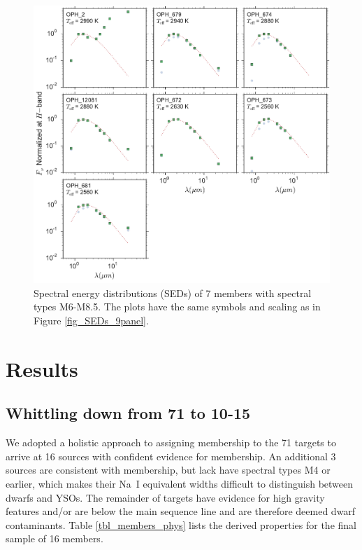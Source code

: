 \documentclass[12pt,preprint]{aastex}
\begin{document}
\begin{figure}[ht!]
  \caption{ Spectral energy distributions (SEDs) of 7 members with spectral types M6-M8.5.  The plots have the same symbols and scaling as in Figure \ref{fig_SEDs_9panel}.  \label{fig_SEDs_7panel} }
\centering
\includegraphics[scale=0.6]{figures/SEDS_7panel}
\end{figure}

\section{Results}
\subsection{Whittling down from 71 to 10-15}
We adopted a holistic approach to assigning membership to the 71 targets to arrive at 16 sources with confident evidence for membership.  An additional 3 sources are consistent with membership, but lack have spectral types M4 or earlier, which makes their Na~I equivalent widths difficult to distinguish between dwarfs and YSOs.  The remainder of targets have evidence for high gravity features and/or are below the main sequence line and are therefore deemed dwarf contaminants.  Table \ref{tbl_members_phys} lists the derived properties for the final sample of 16 members.  
\end{document}
